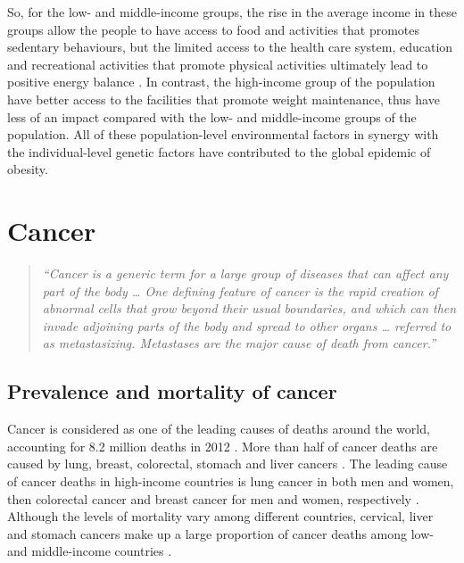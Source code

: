 So, for the low- and middle-income groups, the rise in the average income in these groups allow the people to have access to food and activities that promotes sedentary behaviours, but the limited access to the health care system, education and recreational activities that promote physical activities ultimately lead to positive energy balance \citep{Malik2013}.
In contrast, the high-income group of the population have better access to the facilities that promote weight maintenance, thus have less of an impact compared with the low- and middle-income groups of the population.
All of these population-level environmental factors in synergy with the individual-level genetic factors have contributed to the global epidemic of obesity.

\section{Cancer}
\label{sec:cancer}

\begin{quote}
	\textit{
	``Cancer is a generic term for a large group of diseases that can affect any part of the body \ldots{}
	One defining feature of cancer is the rapid creation of abnormal cells that grow beyond their usual boundaries, and which can then invade adjoining parts of the body and spread to other organs \ldots{}
	referred to as metastasizing.
	Metastases are the major cause of death from cancer.''
	\citep{WHO2016}
	}
\end{quote}

\subsection{Prevalence and mortality of cancer}
\label{sub:prevalence_and_mortality_of_cancer}

Cancer is considered as one of the leading causes of deaths around the world, accounting for 8.2 million deaths in 2012 \citep{WHO2014}.
More than half of cancer deaths are caused by lung, breast, colorectal, stomach and liver cancers \citep{WHO2014}.
The leading cause of cancer deaths in high-income countries is lung cancer in both men and women, then colorectal cancer and breast cancer for men and women, respectively \citep{WHO2014}.
Although the levels of mortality vary among different countries, cervical, liver and stomach cancers make up a large proportion of cancer deaths among low- and middle-income countries \citep{WHO2014}.

